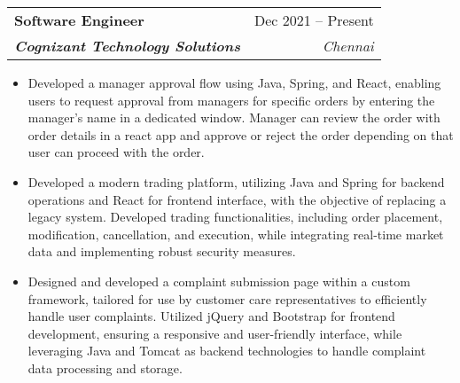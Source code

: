 \documentclass[letterpaper,11pt]{article}
\makeatletter
\newcommand{\resumeItem}[1]{
  \item\small{
    {#1 \vspace{-2pt}}
  }
}
\newcommand{\resumeSubheading}[4]{
  \vspace{-2pt}\item
    \begin{tabular*}{0.97\textwidth}[t]{l@{\extracolsep{\fill}}r}
      \textbf{#1} & #2 \\
      \textit{\small#3} & \textit{\small #4} \\
    \end{tabular*}\vspace{-7pt}
}
\newcommand{\resumeSubSubheading}[2]{
    \item
    \begin{tabular*}{0.97\textwidth}{l@{\extracolsep{\fill}}r}
      \textit{\small#1} & \textit{\small #2} \\
    \end{tabular*}\vspace{-7pt}
}
\newcommand{\resumeSubHeadingListEnd}{\end{itemize}}
\newcommand{\resumeItemListStart}{\begin{itemize}}
\newcommand{\resumeItemListEnd}{\end{itemize}\vspace{-5pt}}
\makeatother
\begin{document}
    \resumeSubheading
      {Software Engineer}{Dec 2021 -- Present}
      {\textbf{\textit{Cognizant Technology Solutions}}}{Chennai}
      \resumeItemListStart
        \resumeItem{ Developed a manager approval flow using Java, Spring, and React, enabling users to request approval from managers for specific orders by entering the manager's name in a dedicated window. Manager can review the order with order details in a react app and approve or reject the order depending on that user can proceed with the order.}
        \resumeItem{Developed a modern trading platform, utilizing Java and Spring for backend operations and React for frontend interface, with the objective of replacing a legacy system. Developed trading functionalities, including order placement, modification, cancellation, and execution, while integrating real-time market data and implementing robust security measures.}
        \resumeItem{Designed and developed a complaint submission page within a custom framework, tailored for use by customer care representatives to efficiently handle user complaints. Utilized jQuery and Bootstrap for frontend development, ensuring a responsive and user-friendly interface, while leveraging Java and Tomcat as backend technologies to handle complaint data processing and storage.}
      \resumeItemListEnd


      


\end{document}
